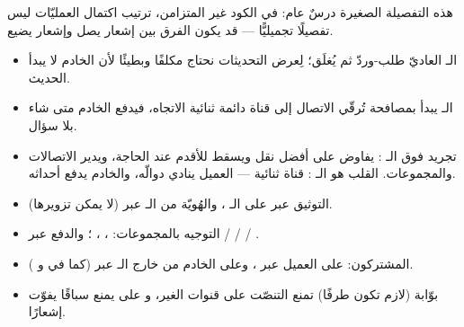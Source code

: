 هذه التفصيلة الصغيرة درسٌ عام: في الكود غير المتزامن، ترتيب اكتمال العمليّات ليس
تفصيلًا تجميليًّا — قد يكون الفرق بين إشعار يصل وإشعار يضيع.

\begin{summary}
\begin{itemize}
\item الـ  العاديّ طلب-وردّ ثم يُغلَق؛ لِعرض التحديثات نحتاج 
  مكلفًا وبطيئًا لأن الخادم لا يبدأ الحديث.
\item الـ  يبدأ بمصافحة  تُرقّي الاتصال إلى قناة
  دائمة ثنائية الاتجاه، فيدفع الخادم  متى شاء بلا سؤال.
\item {} تجريد فوق الـ : يفاوض على أفضل نقل ويسقط للأقدم
  عند الحاجة، ويدير الاتصالات والمجموعات. القلب هو الـ : قناة ثنائية —
  العميل ينادي دوالّه، والخادم يدفع أحداثه.
\item التوثيق عبر \code{[Authorize]} على الـ ، والهُويّة من الـ 
  عبر  (لا يمكن تزويرها).
\item التوجيه بالمجموعات: ، ،
  ؛ والدفع عبر  /  /
   / .
\item المشتركون: على العميل عبر ، وعلى الخادم من خارج
  الـ  عبر  (كما في  و
  ).
\item بوّابة  (لازم تكون طرفًا) تمنع التنصّت على قنوات الغير، و
   على  يمنع سباقًا يفوّت إشعارًا.
\end{itemize}
\end{summary}
